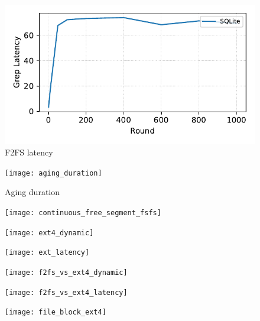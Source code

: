 \begin{figure}[t]
    \centering
    \includegraphics[width=0.95\columnwidth]{graphs/py_graph/latency-f2fs}
    \caption{F2FS latency}
    \label{f:f2fs_latency}
\end{figure}


\begin{figure}[t]
    \centering
	\texttt{[image: aging\_duration]}
    \caption{Aging duration}
    \label{f:aging_duration}
\end{figure}

\begin{figure}[t]
    \centering
	\texttt{[image: continuous\_free\_segment\_fsfs]}
	\caption{}
	\label{f:}
\end{figure}

\begin{figure}[t]
    \centering
	\texttt{[image: ext4\_dynamic]}
	\caption{}
	\label{f:}
\end{figure}

\begin{figure}[t]
    \centering
	\texttt{[image: ext\_latency]}
	\caption{}
	\label{f:}
\end{figure}

\begin{figure}[t]
    \centering
	\texttt{[image: f2fs\_vs\_ext4\_dynamic]}
	\caption{}
	\label{f:}
\end{figure}

\begin{figure}[t]
    \centering
	\texttt{[image: f2fs\_vs\_ext4\_latency]}
	\caption{}
	\label{f:}
\end{figure}

\begin{figure}[t]
    \centering
	\texttt{[image: file\_block\_ext4]}
	\caption{}
	\label{f:}
\end{figure}

